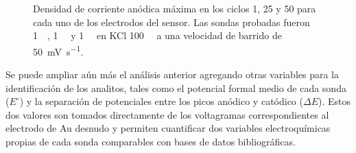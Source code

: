 \begin{figure}[b!]
\begin{subfigure}[t]{0.495\textwidth}
		 	   \end{subfigure}
		      	\caption[Corriente de pico en distintos ciclos voltamperometricos]{Densidad de corriente anódica máxima en los ciclos 1, 25 y 50 para cada uno de los electrodos del sensor. Las sondas probadas fueron \fc \SI{1}{\milli\Molar}, \fe\space \SI{1}{\milli\Molar} y \ru\space \SI{1}{\milli\Molar} en KCl \SI{100}{\milli\Molar} a una velocidad de barrido de \SI{50}{\milli\volt\per\second}.}
		      	\label{fig:barras}
		      	\end{figure}
     	
	 Se puede ampliar aún más el análisis anterior agregando otras variables para la identificación de los analitos, tales como el potencial formal medio de cada sonda ($E^{\circ}$) y la separación de potenciales entre los picos anódico y catódico ($\Delta E$). Estos dos valores son tomados directamente de los voltagramas correspondientes al electrodo de Au desnudo y permiten cuantificar dos variables electroquímicas propias de cada sonda comparables con bases de datos bibliográficas.
	
